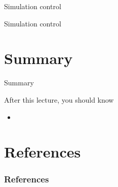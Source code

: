 \documentclass[12pt,t]{beamer}
\begin{document}
\begin{frame}{Simulation control}

\end{frame}

\begin{frame}{Simulation control}

\end{frame}

\section{Summary}
\begin{frame}{Summary}
\begin{block}{After this lecture, you should know}
\begin{itemize}
\item 
\end{itemize}
\end{block}
\end{frame}


\section{References}

\begin{frame}[t, allowframebreaks]
\frametitle{References}


\end{frame}
\end{document}
